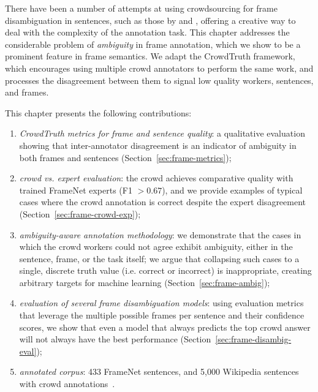 There have been a number of attempts at using crowdsourcing for frame disambiguation in sentences, such as those by \citet{Hong:2011:GCR:2018966.2018970} and \citet{chang2015scaling}, offering a creative way to deal with the complexity of the annotation task. This chapter addresses the considerable problem of \emph{ambiguity}  in frame annotation, which we show to be a prominent feature in frame semantics.  We adapt the CrowdTruth framework, which encourages using multiple crowd annotators to perform the same work, and processes the disagreement between them to signal low quality workers, sentences, and frames.

This chapter presents the following contributions:

\begin{enumerate}

\item \emph{CrowdTruth metrics for frame and sentence quality}: a qualitative evaluation showing that inter-annotator disagreement is an indicator of ambiguity in both frames and sentences (Section~\ref{sec:frame-metrics});

\item \emph{crowd vs. expert evaluation}: the crowd achieves comparative quality with trained FrameNet experts (F1 $>0.67$), and we provide examples of typical cases where the crowd annotation is correct despite the expert disagreement (Section~\ref{sec:frame-crowd-exp});

\item \emph{ambiguity-aware annotation methodology}: we demonstrate that the cases in which the crowd workers could not agree exhibit ambiguity, either in the sentence, frame, or the task itself; we argue that collapsing such cases to a single, discrete truth value (i.e. correct or incorrect) is inappropriate, creating arbitrary targets for machine learning (Section~\ref{sec:frame-ambig});

\item \emph{evaluation of several frame disambiguation models}: using evaluation metrics that leverage the multiple possible frames per sentence and their confidence scores, we show that even a model that always predicts the top crowd answer will not always have the best performance (Section~\ref{sec:frame-disambig-eval});

\item \emph{annotated corpus}: 433 FrameNet sentences, and 5,000 Wikipedia sentences with crowd annotations~\cite{anca_dumitrache_2018_1472345}.

\end{enumerate}



